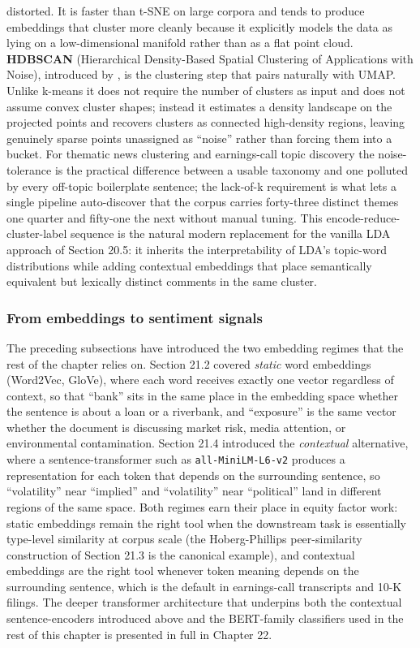 distorted. It is faster than t-SNE on large corpora and tends to produce embeddings that cluster more cleanly because it explicitly models the data as lying on a low-dimensional manifold rather than as a flat point cloud. \textbf{HDBSCAN} (Hierarchical Density-Based Spatial Clustering of Applications with Noise), introduced by \cite{campello2013hdbscan}, is the clustering step that pairs naturally with UMAP. Unlike k-means it does not require the number of clusters as input and does not assume convex cluster shapes; instead it estimates a density landscape on the projected points and recovers clusters as connected high-density regions, leaving genuinely sparse points unassigned as ``noise'' rather than forcing them into a bucket. For thematic news clustering and earnings-call topic discovery the noise-tolerance is the practical difference between a usable taxonomy and one polluted by every off-topic boilerplate sentence; the lack-of-k requirement is what lets a single pipeline auto-discover that the corpus carries forty-three distinct themes one quarter and fifty-one the next without manual tuning. This encode-reduce-cluster-label sequence is the natural modern replacement for the vanilla LDA approach of Section 20.5: it inherits the interpretability of LDA's topic-word distributions while adding contextual embeddings that place semantically equivalent but lexically distinct comments in the same cluster.

\subsubsection{From embeddings to sentiment signals}

The preceding subsections have introduced the two embedding regimes that the rest of the chapter relies on. Section 21.2 covered \textit{static} word embeddings (Word2Vec, GloVe), where each word receives exactly one vector regardless of context, so that ``bank'' sits in the same place in the embedding space whether the sentence is about a loan or a riverbank, and ``exposure'' is the same vector whether the document is discussing market risk, media attention, or environmental contamination. Section 21.4 introduced the \textit{contextual} alternative, where a sentence-transformer such as \texttt{all-MiniLM-L6-v2} produces a representation for each token that depends on the surrounding sentence, so ``volatility'' near ``implied'' and ``volatility'' near ``political'' land in different regions of the same space. Both regimes earn their place in equity factor work: static embeddings remain the right tool when the downstream task is essentially type-level similarity at corpus scale (the Hoberg-Phillips peer-similarity construction of Section 21.3 is the canonical example), and contextual embeddings are the right tool whenever token meaning depends on the surrounding sentence, which is the default in earnings-call transcripts and 10-K filings. The deeper transformer architecture that underpins both the contextual sentence-encoders introduced above and the BERT-family classifiers used in the rest of this chapter is presented in full in Chapter 22.

